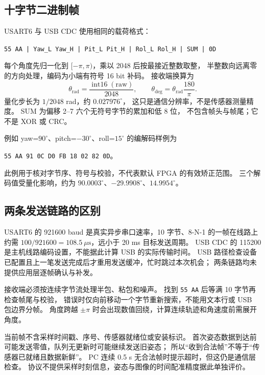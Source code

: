 \subsection{十字节二进制帧}
USART6 与 USB CDC 使用相同的载荷格式：
\begin{center}\small
\texttt{55 AA | Yaw\_L Yaw\_H | Pit\_L Pit\_H | Rol\_L Rol\_H | SUM | 0D}
\end{center}
每个角度先归一化到 $[-\pi,\pi)$，乘以 2048 后按最接近整数取整，
半整数向远离零的方向处理，编码为小端有符号 16 bit 补码。
接收端换算为
\begin{equation}
\theta_{\mathrm{rad}}=\frac{\operatorname{int16}(\mathrm{raw})}{2048},
\qquad
\theta_{\mathrm{deg}}=\theta_{\mathrm{rad}}\frac{180}{\pi}.
\end{equation}
量化步长为 $1/2048$ rad，约 $0.027976^\circ$，
这只是通信分辨率，不是传感器测量精度。
SUM 为偏移 2--7 六个无符号字节的累加和低 8 位，
不包含帧头与帧尾；它不是 XOR 或 CRC。

例如 yaw=$90^\circ$、pitch=$-30^\circ$、roll=$15^\circ$ 的编解码样例为
\begin{center}\small\texttt{55 AA 91 0C D0 FB 18 02 82 0D}。
\end{center}
此例用于核对字节序、符号与校验，不代表默认 FPGA 的有效矫正范围。
三个解码值受量化影响，约为 $90.0003^\circ$、$-29.9908^\circ$、$14.9954^\circ$。

\subsection{两条发送链路的区别}
USART6 的 921600 baud 是真实异步串口速率，10 字节、8-N-1 的一帧在线路上约需
$100/921600=108.5\ \mu\mathrm s$，远小于 20 ms 目标发送周期。
USB CDC 的 115200 是主机线路编码设置，不能据此计算 USB 的实际传输时间。
USB 路径检查设备已配置且上一笔发送完成后才重用发送缓冲，忙时跳过本次机会；
两条链路均未提供应用层逐帧确认与补发。

接收端必须按连续字节流处理半包、粘包和噪声。
找到 \texttt{55 AA} 后等满 10 字节再检查帧尾与校验，
错误时仅向前移动一个字节重新搜索，不能用文本行或 USB 包边界分帧。
角度跨越 $\pm\pi$ 时会出现数值回绕，计算连续轨迹和角速度前需展开角度。

当前帧不含采样时间戳、序号、传感器就绪位或安装标识。
首次姿态数据到达前可能发送零值，队列无更新时可能继续发送旧姿态；
所以“收到合法帧”不等于“传感器已就绪且数据新鲜”。
PC 连续 0.5 s 无合法帧时提示超时，但这仍是通信层检查。
协议不提供采样时刻信息，姿态与图像的时间配准精度据此单独评价。

